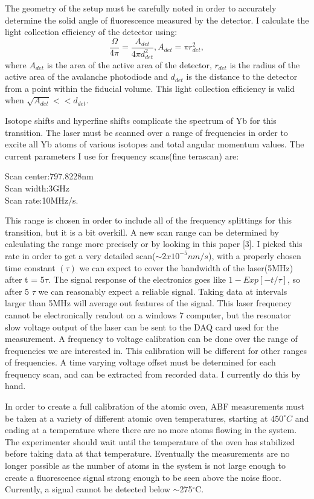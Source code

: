 \documentclass[12pt, a4paper]{article}
\begin{document}
The geometry of the setup must be carefully noted in order to accurately determine the solid angle of fluorescence measured by the detector. I calculate the light collection efficiency of the detector using:
\begin{equation}
\frac{\Omega}{4\pi} = \frac{A_{det}}{4\pi d_{det}^2},
A_{det} = \pi r_{det}^2,
\end{equation}
where $A_{det}$ is the area of the active area of the detector, $r_{det}$ is the radius of the active area of the avalanche photodiode and $d_{det}$ is the distance to the detector from a point within the fiducial volume. This light collection efficiency is valid when $\sqrt{A_{det}} << d_{det}$.

Isotope shifts and hyperfine shifts complicate the spectrum of Yb for this transition. The laser must be scanned over a range of frequencies in order to excite all Yb atoms of various isotopes and total angular momentum values. The current parameters I use for frequency scans(fine terascan) are:
\begin{center}
Scan center:797.8228nm\\
Scan width:3GHz\\
Scan rate:10MHz/s.\\
\end{center}
This range is chosen in order to include all of the frequency splittings for this transition, but it is a bit overkill.  A new scan range can be determined by calculating the range more precisely or by looking in this paper [3]. I picked this rate in order to get a very detailed scan($\sim 2x10^{-5}nm/s$), with a properly chosen time constant $(\tau)$ we can expect to cover the bandwidth of the laser(5MHz) after t = 5$\tau$. The signal response of the electronics goes like $1-Exp[-t/\tau]$, so after 5 $\tau$ we can reasonably expect a reliable signal. Taking data at intervals larger than 5MHz will average out features of the signal. This laser frequency cannot be electronically readout on a windows 7 computer, but the resonator slow voltage output of the laser can be sent to the DAQ card used for the measurement. A frequency to voltage calibration can be done over the range of frequencies we are interested in. This calibration will be different for other ranges of frequencies. A time varying voltage offset must be determined for each frequency scan, and can be extracted from recorded data. I currently do this by hand.

In order to create a full calibration of the atomic oven, ABF measurements must be taken at a variety of different atomic oven temperatures, starting at $450^{\circ}C$ and ending at a temperature where there are no more atoms flowing in the system. The experimenter should wait until the temperature of the oven has stabilized before taking data at that temperature. Eventually the measurements are no longer possible as the number of atoms in the system is not large enough to create a fluorescence signal strong enough to be seen above the noise floor. Currently, a signal cannot be detected below $\sim$275$^{\circ}$C. 
\end{document}
